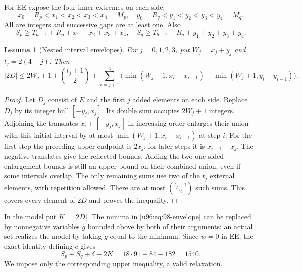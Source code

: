\documentclass[11pt,a4paper]{article}
\newtheorem{lemma}[theorem]{Lemma}
\theoremstyle{remark}
\begin{document}
For EE expose the four inner extremes on each side:
\[
 x_0=R_p<x_1<x_2<x_3<x_4=M_p,
 \quad y_0=R_q<y_1<y_2<y_3<y_4=M_q.
\]
All are integers and successive gaps are at least one. Also
\[
 S_p\geq T_{a-1}+R_p+x_1+x_2+x_3+x_4,
 \quad S_q\geq T_{b-1}+R_q+y_1+y_2+y_3+y_4.
\]
\begin{lemma}[Nested interval envelopes]\label{u96:lem:envelope98}
For $j=0,1,2,3$, put $W_j=x_j+y_j$ and $t_j=2(4-j)$. Then
\begin{equation}
 |2D|\leq2W_j+1+\binom{t_j+1}{2}
 +\sum_{i=j+1}^4
  \bigl(\min(W_j+1,x_i-x_{i-1})+
        \min(W_j+1,y_i-y_{i-1})\bigr).
 \label{u96:eq:98-envelope}
\end{equation}
\end{lemma}
\begin{proof}
Let $D_j$ consist of $E$ and the first $j$ added elements on each side.
Replace $D_j$ by its integer hull $[-y_j,x_j]$.
Its double sum occupies $2W_j+1$ integers. Adjoining the translates
$x_i+[-y_j,x_j]$ in increasing order enlarges their union with this
initial interval by at most $\min(W_j+1,x_i-x_{i-1})$ at step $i$.
For the first step the preceding upper endpoint is $2x_j$; for later
steps it is $x_{i-1}+x_j$. The negative translates give the reflected
bounds. Adding the two one-sided enlargement bounds is still an upper
bound on their combined union, even if some intervals overlap.
The only remaining sums use two of the $t_j$ external elements, with
repetition allowed. There are at most $\binom{t_j+1}{2}$ such sums.
This covers every element of $2D$ and proves the inequality.
\end{proof}
In the model put $K=|2D|$. The minima in \eqref{u96:eq:98-envelope} can be
replaced by nonnegative variables $g$ bounded above by both of their
arguments: an actual set realizes the model by taking $g$ equal to the
minimum. Since $w=0$ in EE, the exact identity defining $c$ gives
\begin{equation}
 S_p+S_q+\delta-2K=18\cdot91+84-182=1540.
 \label{u96:eq:98-mass-cardinality}
\end{equation}
We impose only the corresponding upper inequality, a valid relaxation.
\end{document}
